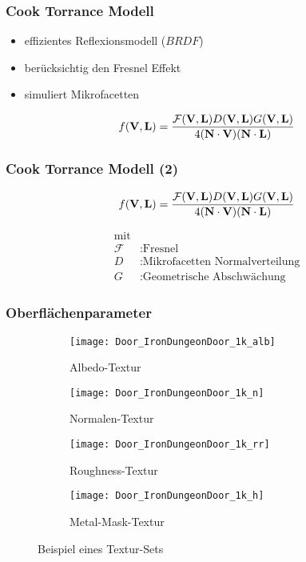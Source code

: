 \begin{frame}
  \frametitle{Cook Torrance Modell}
  \begin{itemize}
    \item<1-> {effizientes Reflexionsmodell ($BRDF$)}
    \item<2-> {berücksichtig den Fresnel Effekt}
    \item<3-> {simuliert Mikrofacetten}
  \end{itemize}
  \pause
  \begin{Definition}
    \begin{align}
    	f(\mathbf V,\mathbf L) = \frac{\mathcal{F}(\mathbf V,\mathbf L)D(\mathbf V,\mathbf L)G(\mathbf V,\mathbf L)}{4(\mathbf N \cdot \mathbf V)(\mathbf N \cdot \mathbf L)}
    \end{align}
  \end{Definition}
\end{frame}

\begin{frame}
  \frametitle{Cook Torrance Modell (2)}
  \begin{Definition}

    \begin{align*}
    	f(\mathbf V,\mathbf L) = \frac{\mathcal{F}(\mathbf V,\mathbf L)D(\mathbf V,\mathbf L)G(\mathbf V,\mathbf L)}{4(\mathbf N \cdot \mathbf V)(\mathbf N \cdot \mathbf L)}
    \end{align*}

    \begin{align*}
      \text{mit}\\
      \mathcal{F} &: \text{Fresnel} \\
    	D  &: \text{Mikrofacetten Normalverteilung} \\
    	G  &: \text{Geometrische Abschwächung}
    \end{align*}

  \end{Definition}
\end{frame}

\begin{frame}
  \frametitle{Oberflächenparameter}

  \begin{figure}
    \centering
    \begin{subfigure}{0.24\textwidth}
    	\texttt{[image: Door\_IronDungeonDoor\_1k\_alb]}
    	\caption{Albedo-Textur}
    \end{subfigure}
    \begin{subfigure}{0.24\textwidth}
    	\texttt{[image: Door\_IronDungeonDoor\_1k\_n]}
    	\caption{Normalen-Textur}
    \end{subfigure}
    \begin{subfigure}{0.24\textwidth}
    	\texttt{[image: Door\_IronDungeonDoor\_1k\_rr]}
    	\caption{Roughness-Textur}
    \end{subfigure}
    \begin{subfigure}{0.24\textwidth}
    	\texttt{[image: Door\_IronDungeonDoor\_1k\_h]}
    	\caption{Metal-Mask-Textur}
    \end{subfigure}
    \caption{Beispiel eines Textur-Sets}
  \end{figure}

\end{frame}


